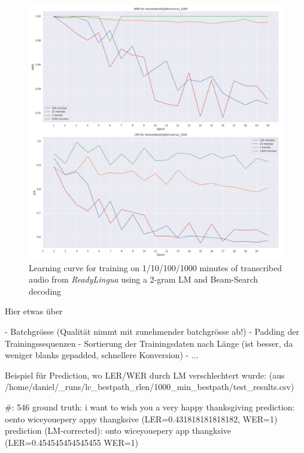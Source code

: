 \begin{figure}
	\includegraphics[width=\linewidth]{./img/learning_curve_lm_beamsearch.png}
	\caption{Learning curve for training on 1/10/100/1000 minutes of transcribed audio from \textit{ReadyLingua} using a 2-gram \ac{LM} and Beam-Search decoding}
	\label{learning_curve_with_lm}
\end{figure}

Hier etwas über

- Batchgrösse (Qualität nimmt mit zunehmender batchgrösse ab!)
- Padding der Trainingssequenzen
- Sortierung der Trainingsdaten nach Länge (ist besser, da weniger blanks gepadded, schnellere Konversion)
- ...

Beispiel für Prediction, wo LER/WER durch LM verschlechtert wurde: (aus /home/daniel/_runs/lc_bestpath_rlen/1000_min_bestpath/test_results.csv)

#: 546	
ground truth: i want to wish you a very happy thanksgiving	
prediction: oento wiceyouepery appy thangksive (LER=0.431818181818182, WER=1)
prediction (LM-corrected): onto wiceyouepery app thangksive	(LER=0.454545454545455	WER=1)



